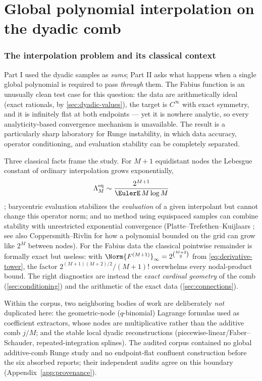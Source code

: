\part{Global polynomial interpolation on the dyadic comb}
\label{part:interp}

\section{The interpolation problem and its classical context}
\label{sec:interp-context}

Part I used the dyadic samples as \emph{sums}; Part II asks what
happens when a single global polynomial is required to pass
\emph{through} them.  The Fabius function is an unusually clean test
case for this question: the data are arithmetically ideal (exact
rationals, by \cref{sec:dyadic-values}), the target is $C^\infty$ with
exact symmetry, and it is infinitely flat at both endpoints --- yet it
is nowhere analytic, so every analyticity-based convergence mechanism
is unavailable.  The result is a particularly sharp laboratory for
Runge instability, in which data accuracy, operator conditioning, and
evaluation stability can be completely separated.

Three classical facts frame the study.  For $M+1$ equidistant nodes
the Lebesgue constant of ordinary interpolation grows exponentially,
\begin{equation}
 \Lambda^{\mathrm{eq}}_M
 \sim\frac{2^{M+1}}{\EulerE\,M\log M}
 \label{eq:classical-lebesgue}
\end{equation}
\cite{Mills1992,Brutman1997,Smith2006}; barycentric evaluation
\cite{BerrutTrefethen2004,Higham2004} stabilizes the \emph{evaluation}
of a given interpolant but cannot change this operator norm; and no
method using equispaced samples can combine stability with
unrestricted exponential convergence (Platte--Trefethen--Kuijlaars
\cite{PlatteTrefethenKuijlaars2011}; see also Coppersmith--Rivlin
\cite{CoppersmithRivlin1992} for how a polynomial bounded on the grid
can grow like $2^{M}$ between nodes).  For the Fabius data the
classical pointwise remainder is formally exact but useless: with
$\Norm{F^{(M+1)}}_\infty=2^{\binom{M+2}2}$ from
\eqref{eq:derivative-tower}, the factor
$2^{(M+1)(M+2)/2}/(M+1)!$ overwhelms every nodal-product bound.  The
right diagnostics are instead the \emph{exact cardinal geometry} of
the comb (\cref{sec:conditioning}) and the arithmetic of the exact
data (\cref{sec:connections}).

Within the corpus, two neighboring bodies of work are deliberately
\emph{not} duplicated here: the geometric-node ($q$-binomial) Lagrange
formulas used as coefficient extractors, whose nodes are
multiplicative rather than the additive comb $j/M$; and the stable
local dyadic reconstructions (piecewise-linear/Faber--Schauder,
repeated-integration splines).  The audited corpus contained no global
additive-comb Runge study and no endpoint-flat confluent construction
before the six absorbed reports; their independent audits agree on
this boundary (Appendix~\ref{app:provenance}).

